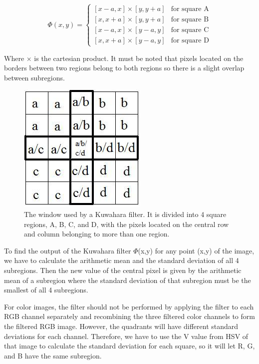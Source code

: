 \documentclass{article}
\begin{document}
$$
\Phi(x,y)=\begin{cases}
			[x-a,x] \times [y,y+a] & \text{for square A}\\
            [x,x+a] \times [y,y+a] & \text{for square B}\\
            [x-a,x] \times [y-a,y] & \text{for square C}\\
            [x,x+a] \times [y-a,y] & \text{for square D}
		 \end{cases}
$$

Where $\times$ is the cartesian product. It must be noted that pixels located on the borders between two regions belong to both regions so there is a slight overlap between subregions.

\begin{figure}
    \centering
    \includegraphics{images/Kuwahara.jpg}
    \caption{The window used by a Kuwahara filter. It is divided into 4 square regions, A, B, C, and D, with the pixels located on the central row and column belonging to more than one region. }
    \label{fig:figure1}
\end{figure}

To find the output of the Kuwahara filter $\Phi$(x,y) for any point (x,y) of the image, we have to calculate the arithmetic mean and the standard deviation of all 4 subregions. Then the new value of the central pixel is given by the arithmetic mean of a subregion where the standard deviation of that subregion must be the smallest of all 4 subregions. 

For color images, the filter should not be performed by applying the filter to each RGB channel separately and recombining the three filtered color channels to form the filtered RGB image. However, the quadrants will have different standard deviations for each channel. Therefore, we have to use the V value from HSV of that image to calculate the standard deviation for each square, so it will let R, G, and B have the same subregion. 
\end{document}
